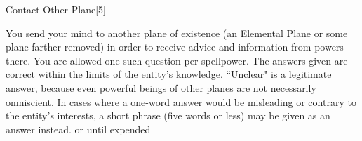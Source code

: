 \begin{spellsection}{Contact Other Plane}[5]
    \begin{spellheader}
    \end{spellheader}
    \begin{spellcontent}
        \begin{spelltargetinginfo}
        \end{spelltargetinginfo}
        \begin{spelleffects}

            \spelleffect You send your mind to another plane of existence (an Elemental Plane or some plane farther removed) in order to receive advice and information from powers there. You are allowed one such question per spellpower. The answers given are correct within the limits of the entity's knowledge. ``Unclear" is a legitimate answer, because even powerful beings of other planes are not necessarily omniscient. In cases where a one-word answer would be misleading or contrary to the entity's interests, a short phrase (five words or less) may be given as an answer instead.
            \spelldur \durmed or until expended
        \end{spelleffects}
    \end{spellcontent}
    \begin{spellfooter}
    \end{spellfooter}
\end{spellsection}

